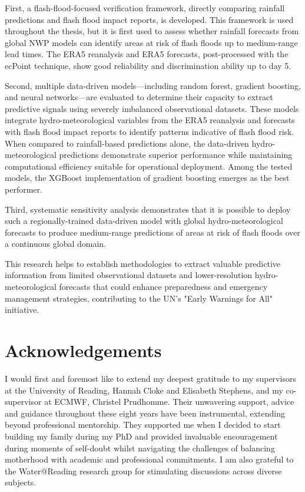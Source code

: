 \documentclass{thesis} %
\begin{document}
First, a flash-flood-focused verification framework, directly comparing rainfall predictions and flash flood impact reports, is developed. This framework is used throughout the thesis, but it is first used to assess whether rainfall forecasts from global NWP models can identify areas at risk of flash floods up to medium-range lead times. The ERA5 reanalysis and ERA5 forecasts, post-processed with the ecPoint technique, show good reliability and discrimination ability up to day 5. 

Second, multiple data-driven models—including random forest, gradient boosting, and neural networks—are evaluated to determine their capacity to extract predictive signals using severely imbalanced observational datasets. These models integrate hydro-meteorological variables from the ERA5 reanalysis and forecasts with flash flood impact reports to identify patterns indicative of flash flood risk. When compared to rainfall-based predictions alone, the data-driven hydro-meteorological predictions demonstrate superior performance while maintaining computational efficiency suitable for operational deployment. Among the tested models, the XGBoost implementation of gradient boosting emerges as the best performer.

Third, systematic sensitivity analysis demonstrates that it is possible to deploy such a regionally-trained data-driven model with global hydro-meteorological forecasts to produce medium-range predictions of areas at risk of flash floods over a continuous global domain. 

This research helps to establish methodologies to extract valuable predictive information from limited observational datasets and lower-resolution hydro-meteorological forecasts that could enhance preparedness and emergency management strategies, contributing to the UN's "Early Warnings for All" initiative. 


\newpage
\null
\newpage
\setcounter{page}{5} %


\chapter*{\Large Acknowledgements}

I would first and foremost like to extend my deepest gratitude to my supervisors at the University of Reading, Hannah Cloke and Elisabeth Stephens, and my co-supervisor at ECMWF, Christel Prudhomme. Their unwavering support, advice and guidance throughout these eight years have been instrumental, extending beyond professional mentorship. They supported me when I decided to start building my family during my PhD and provided invaluable encouragement during moments of self-doubt whilst navigating the challenges of balancing motherhood with academic and professional commitments. I am also grateful to the Water@Reading research group for stimulating discussions across diverse subjects.
\end{document}
